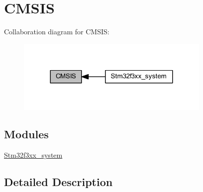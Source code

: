 \hypertarget{group___c_m_s_i_s}{}\section{C\+M\+S\+I\+S}
\label{group___c_m_s_i_s}
Collaboration diagram for C\+M\+S\+I\+S\+:\nopagebreak
\begin{figure}[H]
\begin{center}
\leavevmode
\includegraphics[width=264pt]{group___c_m_s_i_s}
\end{center}
\end{figure}
\subsection*{Modules}
\begin{DoxyCompactItemize}
\item 
\hyperlink{group__stm32f3xx__system}{Stm32f3xx\+\_\+system}
\end{DoxyCompactItemize}


\subsection{Detailed Description}
